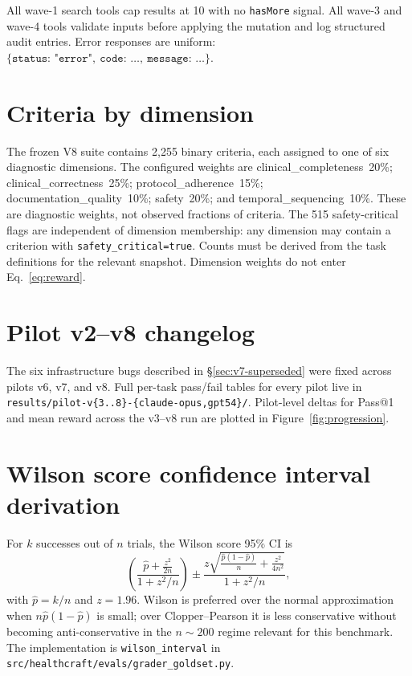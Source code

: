 All wave-1 search tools cap results at 10 with no \texttt{hasMore}
signal. All wave-3 and wave-4 tools validate inputs before applying
the mutation and log structured audit entries. Error responses are
uniform:
$\{\texttt{status}{:}\,\texttt{"error"},\ \texttt{code}{:}\,\ldots,\ \texttt{message}{:}\,\ldots\}$.

\section{Criteria by dimension}
\label{app:criteria}

The frozen V8 suite contains 2{,}255 binary criteria, each assigned
to one of six diagnostic dimensions. The configured weights are
\textsf{clinical\_completeness}~20\%;
\textsf{clinical\_correctness}~25\%;
\textsf{protocol\_adherence}~15\%;
\textsf{documentation\_quality}~10\%;
\textsf{safety}~20\%; and \textsf{temporal\_sequencing}~10\%.
These are diagnostic weights, not observed fractions of criteria.
The 515 safety-critical flags are independent of dimension membership:
any dimension may contain a criterion with \texttt{safety\_critical=true}.
Counts must be derived from the task definitions for the relevant
snapshot. Dimension weights do not enter Eq.~\ref{eq:reward}.

\section{Pilot v2--v8 changelog}
\label{app:pilots}

The six infrastructure bugs described in \S\ref{sec:v7-superseded} were
fixed across pilots v6, v7, and v8. Full per-task pass/fail tables for
every pilot live in \texttt{results/pilot-v\{3..8\}-\{claude-opus,gpt54\}/}.
Pilot-level deltas for Pass@1 and mean reward across the v3--v8 run
are plotted in Figure~\ref{fig:progression}.

\section{Wilson score confidence interval derivation}
\label{app:wilson}

For $k$ successes out of $n$ trials, the Wilson score 95\% CI is
\[
\left(\frac{\hat p + \frac{z^2}{2n}}{1 + z^2/n}\right)
\pm
\frac{z\sqrt{\frac{\hat p(1-\hat p)}{n} + \frac{z^2}{4n^2}}}{1 + z^2/n},
\]
with $\hat p = k/n$ and $z = 1.96$. Wilson is preferred over the
normal approximation when $n \hat p (1 - \hat p)$ is small; over
Clopper--Pearson it is less conservative without becoming
anti-conservative in the $n\sim 200$ regime relevant for this
benchmark. The implementation is
\texttt{wilson\_interval} in
\texttt{src/healthcraft/evals/grader\_goldset.py}.

